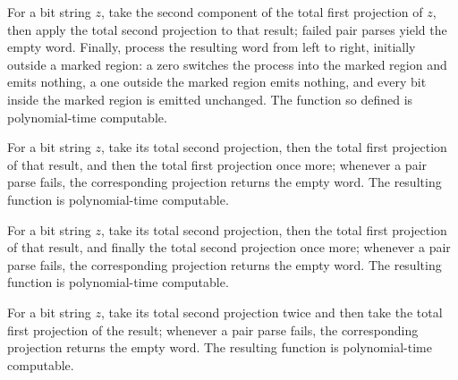 \begin{theorem}
\label{Complexity.Meyer.pt_vD}
\leanok
{}
For a bit string $z$, take the second component of the total first projection of $z$,
then apply the total second projection to that result; failed pair parses yield the
empty word. Finally, process the resulting word from left to right, initially outside a
marked region: a zero switches the process into the marked region and emits nothing, a
one outside the marked region emits nothing, and every bit inside the marked region is
emitted unchanged. The function so defined is polynomial-time computable.
\end{theorem}

\begin{theorem}
\label{Complexity.Meyer.pt_vt}
\leanok
{}
For a bit string $z$, take its total second projection, then the total first projection
of that result, and then the total first projection once more; whenever a pair parse
fails, the corresponding projection returns the empty word. The resulting function is
polynomial-time computable.
\end{theorem}

\begin{theorem}
\label{Complexity.Meyer.pt_va}
\leanok
{}
For a bit string $z$, take its total second projection, then the total first projection
of that result, and finally the total second projection once more; whenever a pair parse
fails, the corresponding projection returns the empty word. The resulting function is
polynomial-time computable.
\end{theorem}

\begin{theorem}
\label{Complexity.Meyer.pt_vj}
\leanok
{}
For a bit string $z$, take its total second projection twice and then take the total
first projection of the result; whenever a pair parse fails, the corresponding
projection returns the empty word. The resulting function is polynomial-time computable.
\end{theorem}

